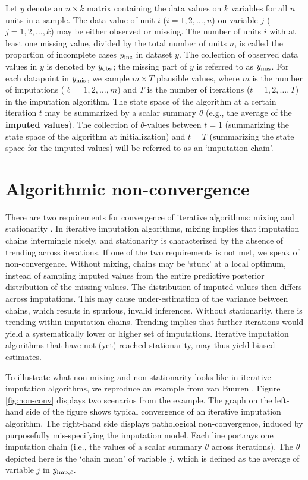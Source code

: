 \documentclass[Royal,times,sageh]{sagej}
\begin{document}
Let \(y\) denote an \(n \times k\) matrix containing the data values on \(k\) variables for all \(n\) units in a sample. The data value of unit \(i\) (\(i = 1, 2, \dots, n\)) on variable \(j\) (\(j = 1, 2, \dots, k\)) may be either observed or missing. The number of units \(i\) with at least one missing value, divided by the total number of units \(n\), is called the proportion of incomplete cases \(p_{\rm inc}\) in dataset \(y\). The collection of observed data values in \(y\) is denoted by \(y_{\rm obs}\); the missing part of \(y\) is referred to as \(y_{\rm mis}\). For each datapoint in \(y_{\rm mis}\), we sample \(m \times T\) plausible values, where \(m\) is the number of imputations (\(\ell = 1, 2, \dots, m\)) and \(T\) is the number of iterations (\(t = 1, 2, \dots, T\)) in the imputation algorithm. The state space of the algorithm at a certain iteration \(t\) may be summarized by a scalar summary \(\theta\) (e.g., the average of the \textbf{imputed values}). The collection of \(\theta\)-values between \(t=1\) (summarizing the state space of the algorithm at initialization) and \(t=T\) (summarizing the state space for the imputed values) will be referred to as an `imputation chain'.

\hypertarget{algorithmic-non-convergence}{%
\section{Algorithmic non-convergence}\label{algorithmic-non-convergence}}

There are two requirements for convergence of iterative algorithms: mixing and stationarity \citep{gelm13}. In iterative imputation algorithms, mixing implies that imputation chains intermingle nicely, and stationarity is characterized by the absence of trending across iterations. If one of the two requirements is not met, we speak of non-convergence. Without mixing, chains may be `stuck' at a local optimum, instead of sampling imputed values from the entire predictive posterior distribution of the missing values. The distribution of imputed values then differs across imputations. This may cause under-estimation of the variance between chains, which results in spurious, invalid inferences. Without stationarity, there is trending within imputation chains. Trending implies that further iterations would yield a systematically lower or higher set of imputations. Iterative imputation algorithms that have not (yet) reached stationarity, may thus yield biased estimates.

To illustrate what non-mixing and non-stationarity looks like in iterative imputation algorithms, we reproduce an example from van Buuren \citeyearpar[\(\S\) 6.5.2]{buur18}. Figure \ref{fig:non-conv} displays two scenarios from the example. The graph on the left-hand side of the figure shows typical convergence of an iterative imputation algorithm. The right-hand side displays pathological non-convergence, induced by purposefully mis-specifying the imputation model. Each line portrays one imputation chain (i.e., the values of a scalar summary \(\theta\) across iterations). The \(\theta\) depicted here is the `chain mean' of variable \(j\), which is defined as the average of variable \(j\) in \(\dot y_{\rm imp, \ell}\).
\end{document}
